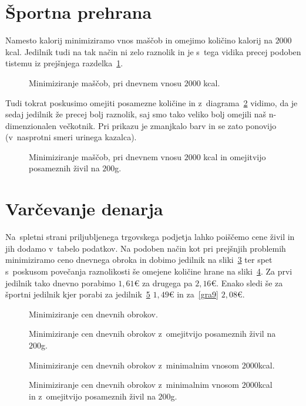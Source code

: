 \documentclass[a4paper,pdftex,12pt]{article} %
\numberwithin{equation}{section} %
\numberwithin{figure}{section} %
\numberwithin{table}{section} %
\begin{document}

\section{Športna prehrana}
Namesto kalorij minimiziramo vnos maščob in omejimo količino kalorij na $2000$kcal.
Jedilnik tudi na tak način ni zelo raznolik in je s~tega vidika precej podoben tistemu iz 
prejšnjega razdelka~\ref{graf4}.
\begin{figure}    
    
    \caption{Minimiziranje maščob, pri dnevnem vnosu $2000$ kcal.}
    \label{graf4}
\end{figure}
Tudi tokrat poskusimo omejiti posamezne količine in z~diagrama~\ref{graf5} vidimo, da
je sedaj jedilnik že precej bolj raznolik, saj smo tako veliko bolj omejili naš 
n-dimenzionalen večkotnik. Pri prikazu je zmanjkalo barv
in se zato ponovijo (v~nasprotni smeri urinega kazalca).
\begin{figure}    
    
    \caption{Minimiziranje maščob, pri dnevnem vnosu $2000$ kcal in omejitvijo posameznih
    živil na $200$g.}
    \label{graf5}
\end{figure}
\section{Varčevanje denarja}
Na~spletni strani priljubljenega trgovskega podjetja lahko poiščemo cene živil in jih
dodamo v~tabelo podatkov. Na podoben način kot pri prejšnjih problemih minimiziramo
ceno dnevnega obroka in dobimo jedilnik na sliki~\ref{graf6} ter spet s~poskusom povečanja
raznolikosti še omejene količine hrane na sliki~\ref{graf7}. Za prvi jedilnik tako
dnevno porabimo $1,61$\euro{} za drugega pa $2,16$\euro{}. Enako sledi še za športni
jedilnik kjer porabi za jedilnik~\ref{graf8} $1,49$\euro{} in za~\ref{gra9} $2,08$\euro{}.
\begin{figure}    
    
    \caption{Minimiziranje cen dnevnih obrokov.}
    \label{graf6}
\end{figure}
\begin{figure}    
    
    \caption{Minimiziranje cen dnevnih obrokov z~omejitvijo posameznih živil na $200$g.}
    \label{graf7}
\end{figure}
\begin{figure}    
    
    \caption{Minimiziranje cen dnevnih obrokov z~minimalnim vnosom $2000$kcal.}
    \label{graf8}
\end{figure}
\begin{figure}    
    
    \caption{Minimiziranje cen dnevnih obrokov z~minimalnim vnosom $2000$kcal in 
    z~omejitvijo posameznih živil na $200$g.}
    \label{graf9}
\end{figure}
\end{document}
